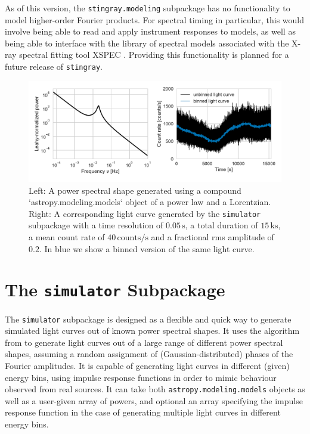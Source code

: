 \documentclass[twocolumn]{aastex62}
\newcommand{\stingray}{\texttt{stingray}\xspace}
\begin{document}
As of this version, the \verb|stingray.modeling| subpackage has no functionality to model higher-order Fourier products. For spectral timing in particular, this would involve being able to read and apply instrument responses to models, as well as being able to interface with the library of spectral models associated with the X-ray spectral fitting tool XSPEC \citep{arnaud1996}. Providing this functionality is planned for a future release of \stingray. 



\begin{figure}[htbp]
\begin{center}
\includegraphics[width=\linewidth]{../figures/sim_lc.pdf}
\caption{Left: A power spectral shape generated using a compound `astropy.modeling.models` object of a power law and a Lorentzian. Right: A corresponding light curve generated by the \texttt{simulator} subpackage with a time resolution of $0.05\,\mathrm{s}$, a total duration of $15\,\mathrm{ks}$, a mean count rate of $40\,\mathrm{counts}/\mathrm{s}$ and a fractional rms amplitude of $0.2$. In blue we show a binned version of the same light curve.}
\label{fig:sim_lc}
\end{center}
\end{figure}

\section{The \texttt{simulator} Subpackage}
\label{sec:simulator}

The \texttt{simulator} subpackage is designed as a flexible and quick way to generate simulated light curves out of known power spectral shapes. It uses the algorithm from \citet{timmer1995} to generate light curves out of a large range of different power spectral shapes, assuming a random assignment of (Gaussian-distributed) phases of the Fourier amplitudes. 
It is capable of generating light curves in different (given) energy bins, using impulse response functions in order to mimic behaviour observed from real sources. It can take both \texttt{astropy.modeling.models} objects as well as a user-given array of powers, and optional an array specifying the impulse response function in the case of generating multiple light curves in different energy bins.
\end{document}

